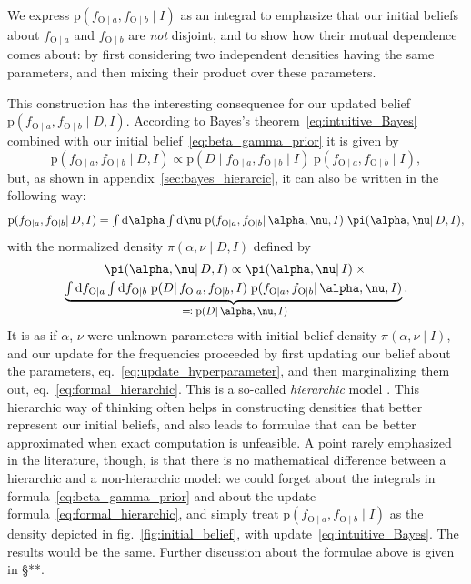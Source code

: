 \documentclass[\ifafour a4paper,12pt,\else a5paper,10pt,\fi%
onecolumn,oneside,article,%
british%
]{memoir}
\theoremstyle{remark}
\theoremstyle{innote}
\newcommand*{\citep}{\parencites}
\newcommand*{\di}{\mathrm{d}}%
\newcommand*{\defs}{\eqqcolon}
\newcommand*{\pf}{\mathrm{p}}%
\renewcommand*{\|}{\mathpunct{|}}
\newcommand*{\sect}{\S}%
\newcommand*{\eqn}{eq.}%
\newcommand*{\fig}{fig.}%
\newcommand*{\zerob}[1]{\makebox[0pt][c]{#1}}
\newcommand*{\tint}{\begingroup\textstyle\int\endgroup\nolimits}
\newcommand*{\yD}{D}
\newcommand*{\yI}{I}
\newcommand*{\ya}{a}
\newcommand*{\yb}{b}
\newcommand*{\ysA}{\textrm{O}}%
\newcommand*{\dbeta}{\betaup}
\newcommand*{\dA}{\pi}
\newcommand*{\yA}{\alpha}
\newcommand*{\yq}{\nu}
\begin{document}
We express $\pf(f_{\ysA\|\ya}, f_{\ysA\|\yb} \| \yI)$ as an integral to
emphasize that our initial beliefs about $f_{\ysA\|\ya}$ and
$f_{\ysA\|\yb}$ are \emph{not} disjoint, and to show how their mutual
dependence comes about: by first considering two independent densities
having the same parameters, and then mixing their product over these
parameters.

This construction has the interesting consequence for our updated belief
$\pf(f_{\ysA\|\ya}, f_{\ysA\|\yb} \| \yD, \yI)$. According to Bayes's
theorem~\eqref{eq:intuitive_Bayes} combined with our initial
belief~\eqref{eq:beta_gamma_prior} it is given by
\begin{equation}
  \label{eq:straight_Bayes}
  \pf(f_{\ysA\|\ya}, f_{\ysA\|\yb} \| \yD, \yI)
  \propto
  \pf(\yD \| f_{\ysA\|\ya}, f_{\ysA\|\yb} \| \yI)\;
  \pf(f_{\ysA\|\ya}, f_{\ysA\|\yb} \| \yI),
\end{equation}
but, as shown in appendix~\ref{sec:bayes_hierarcic}, it can also be written
in the following way:
\begin{equation}
  \label{eq:formal_hierarchic}
  \pf(f_{\ysA\|\ya}, f_{\ysA\|\yb} \| \yD, \yI) =
  \tint\di\yA\tint\di\yq\;
  \pf(f_{\ysA\|\ya}, f_{\ysA\|\yb}\| \yA,\yq,\yI)\;
  \dA(\yA,\yq \|\yD, \yI),
\end{equation}
with the normalized density $\dA(\yA,\yq \|\yD, \yI)$ defined by
\begin{multline}
  \label{eq:update_hyperparameter}
  \dA(\yA,\yq \|\yD, \yI) \propto   \dA(\yA,\yq \|\yI)
\times{}\\
\underbrace{\tint\di f_{\ysA\|\ya}\tint\di f_{\ysA\|\yb}\;
  \pf(\yD \|f_{\ysA\|\ya}, f_{\ysA\|\yb}, \yI)\;
 \pf(f_{\ysA\|\ya}, f_{\ysA\|\yb} \|\yA,\yq, \yI)}_{\zerob{\footnotesize${}\defs\pf(\yD \|\yA,\yq,\yI)$}}.
\end{multline}
It is as if $\yA$, $\yq$ were unknown parameters with initial belief
density $\dA(\yA,\yq \|\yI)$, and our update for the frequencies proceeded by
first updating our belief about the parameters,
\eqn~\eqref{eq:update_hyperparameter}, and then marginalizing them out,
\eqn~\eqref{eq:formal_hierarchic}. This is a so-called \emph{hierarchic}
model \citep{good1980}. This hierarchic way of thinking often helps in
constructing densities that better represent our initial beliefs, and also
leads to formulae that can be better approximated when exact computation is
unfeasible. A point rarely emphasized in the literature, though, is that
there is no mathematical difference between a hierarchic and a
non-hierarchic model: we could forget about the integrals in
formula~\eqref{eq:beta_gamma_prior} and about the update
formula~\eqref{eq:formal_hierarchic}, and simply treat
$\pf(f_{\ysA\|\ya}, f_{\ysA\|\yb} \| \yI)$ as the density depicted in
\fig~\ref{fig:initial_belief}, with update~\eqref{eq:intuitive_Bayes}. The
results would be the same. Further discussion about the formulae above is
given in \sect***.
\end{document}
